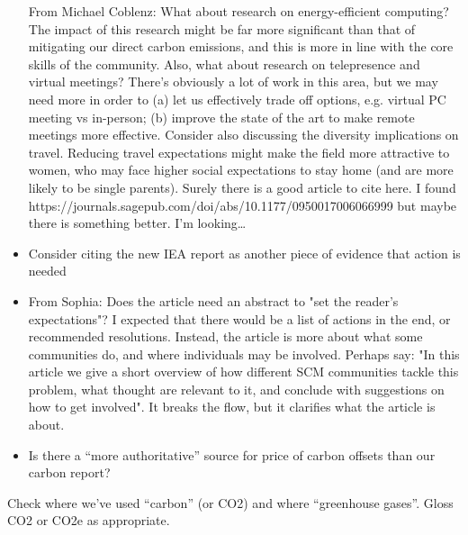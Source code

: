 \documentclass[12pt]{article}
\begin{document}
\begin{itemize}
From Michael Coblenz:
What about research on energy-efficient computing? The impact of this research might be far more significant than that of mitigating our direct carbon emissions, and this is more in line with the core skills of the community.
Also, what about research on telepresence and virtual meetings? There's obviously a lot of work in this area, but we may need more in order to (a) let us effectively trade off options, e.g. virtual PC meeting vs in-person; (b) improve the state of the art to make remote meetings more effective.
Consider also discussing the diversity implications on travel. Reducing travel expectations might make the field more attractive to women, who may face higher social expectations to stay home (and are more likely to be single parents). Surely there is a good article to cite here. I found https://journals.sagepub.com/doi/abs/10.1177/0950017006066999 but maybe there is something better. I'm looking…
\item 
Consider citing the new IEA report as another piece of evidence that action is needed
\item 
From Sophia: Does the article need an abstract to "set the reader's expectations"? I expected that there would be a list of actions in the end, or recommended resolutions. Instead, the article is more about what some communities do, and where individuals may be involved.  Perhaps say: "In this article we give a short overview of how different SCM communities tackle this problem, what thought are relevant to it, and conclude with suggestions on how to get involved". It breaks the flow, but it clarifies what the article is about.
\item 
Is there a ``more authoritative'' source for price of carbon offsets than
our carbon report?
\end{itemize}
\item 
Check where we've used ``carbon'' (or CO2) and where ``greenhouse gases''.  Gloss CO2 or CO2e as appropriate.
\fi

\end{document}
